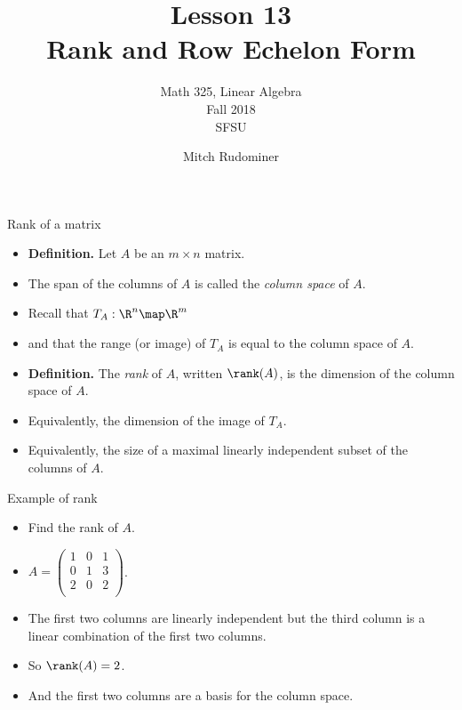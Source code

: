 \documentclass{beamer}
\title{Lesson 13 \\ Rank and Row Echelon Form}
\subtitle{Math 325, Linear Algebra \\ Fall 2018 \\ SFSU}
\author{Mitch Rudominer}
\date{}
\begin{document}
\begin{frame}
  \titlepage
\end{frame}


\begin{frame}{Rank of a matrix}

\begin{itemize}
\item \textbf{Definition.} Let $A$ be an $m\times n$ matrix.
\item The span of the columns of $A$ is called the \emph{column space} of $A$.
\item Recall that $T_A:\R^n\map\R^m$
\item and that the range (or image) of $T_A$ is equal to the column space of $A$.
\item \textbf{Definition.} The \emph{rank} of $A$, written $\rank(A)$,
is the dimension of the column space of $A$.\
\item Equivalently, the dimension of the image of $T_A$.
\item Equivalently, the size of a maximal linearly independent subset of
the columns of $A$.
\end{itemize}
\end{frame}

\begin{frame}{Example of rank}

\begin{itemize}
\item Find the rank of $A$.
\item $A=
\begin{pmatrix}
1  & 0  & 1 \\
0  & 1  & 3 \\
2  & 0  & 2 \\
\end{pmatrix}
$.
\item The first two columns are linearly independent but the third column
is a linear combination of the first two columns.
\item So $\rank(A) = 2$.
\item And the first two columns are a basis for the column space.
\end{itemize}


\end{frame}

\end{document}
